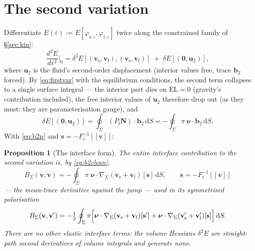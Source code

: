 \documentclass[11pt]{article}
\newtheorem{proposition}{Proposition}
\newcommand{\eps}{\varepsilon}
\newcommand{\bnu}{\bm{\nu}}
\newcommand{\bN}{\mathbf{N}}
\newcommand{\bs}{\mathbf{s}}
\newcommand{\bv}{\mathbf{v}}
\newcommand{\jump}[1]{[\![#1]\!]}
\newcommand{\dS}{\,\mathrm{d}S}
\begin{document}
\section{The second variation}
\label{sec:second}

Differentiate $E(\eps) := E[\varphi_{\mathrm{s},\eps},
\varphi_{\mathrm{f},\eps}]$ twice along the constrained family of
\S\ref{sec:kin}:
\begin{equation}
  \frac{d^2 E}{d\eps^2}\Big|_0
  = \delta^2 E[(\bv_{\mathrm{s}}, \bv_{\mathrm{f}}),
               (\bv_{\mathrm{s}}, \bv_{\mathrm{f}})]
  \;+\; \delta E[(\mathbf{0}, \mathbf{u}_2)],
  \label{eq:d2E}
\end{equation}
where $\mathbf{u}_2$ is the fluid's second-order displacement (interior
values free, trace $\mathbf{b}_2$ forced). By \eqref{eq:firstvar} with
the equilibrium conditions, the second term collapses to a single
surface integral --- the interior part dies on $\text{EL} = 0$
(gravity's contribution included), the free interior values of
$\mathbf{u}_2$ therefore drop out (as they must: they are
parameterisation gauge), and
\begin{equation}
  \delta E[(\mathbf{0},\mathbf{u}_2)]
  = \oint_\Sigma (P_{\mathrm{f}}\bN)\cdot\mathbf{b}_2 \dS
  = -\oint_\Sigma \pi\; \bnu\cdot\mathbf{b}_2 \dS .
\end{equation}
With \eqref{eq:b2n} and $\bs = -F_e^{-1}\jump{\bv}$:

\begin{proposition}[The interface form]\label{prop:BSigma}
The entire interface contribution to the second variation is, by
\eqref{eq:b2clean},
\begin{equation}
  B_\Sigma(\bv, \bv)
  = -\oint_\Sigma \pi\;
      \bnu\cdot \nabla_\Sigma(\bv_{\mathrm{s}} + \bv_{\mathrm{f}})[\bs]
    \dS,
  \qquad \bs = -F_e^{-1}\jump{\bv}
  \label{eq:BSigma}
\end{equation}
--- the mean-trace derivative against the jump --- used in its
symmetrised polarisation
\begin{equation}
  B_\Sigma(\bv, \bv')
  = -\tfrac12\oint_\Sigma \pi \Bigl[
      \bnu\cdot \nabla_\Sigma(\bv_{\mathrm{s}} + \bv_{\mathrm{f}})[\bs']
    + \bnu\cdot \nabla_\Sigma(\bv_{\mathrm{s}}' + \bv_{\mathrm{f}}')[\bs]
    \Bigr] \dS .
  \label{eq:BSigmaPol}
\end{equation}
There are \emph{no other} elastic interface terms: the volume Hessians
$\delta^2 E$ are straight-path second derivatives of volume integrals
and generate none.
\end{proposition}
\end{document}
